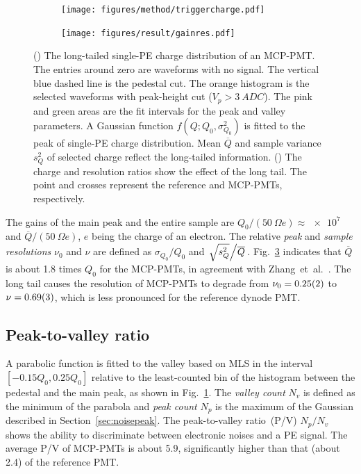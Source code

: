 \begin{figure}[!htbp]
    \centering
    \begin{subfigure}[b]{\SF\textwidth}
        \texttt{[image: figures/method/triggercharge.pdf]}
        \caption{}%
        \label{fig:triggercharge}
    \end{subfigure}
    \begin{subfigure}[b]{\SF\textwidth}
        \texttt{[image: figures/result/gainres.pdf]}
        \caption{}
        \label{fig:totalchargeCompare}
    \end{subfigure}
    \caption{() The long-tailed single-PE charge distribution of an MCP-PMT. The entries around zero are waveforms with no signal. The vertical blue dashed line is the pedestal cut. The orange histogram is the selected waveforms with peak-height cut ($V_p>\SI{3}{ADC}$). The pink and green areas are the fit intervals for the peak and valley parameters. A Gaussian function $f(Q;Q_0,\sigma^2_{Q_0})$ is fitted to the peak of single-PE charge distribution. Mean $\overline{Q}$ and sample variance $s_Q^2$ of selected charge reflect the long-tailed information. () The charge and resolution ratios show the effect of the long tail. The point and crosses represent the reference and MCP-PMTs, respectively.
    }
\end{figure}

The gains of the main peak and the entire sample are ${Q_0}/({\SI{50}{\Omega}} e) \approx \num{e7}$ and ${\overline{Q}}/(\SI{50}{\Omega} e)$, $e$ being the charge of an electron. The relative \emph{peak} and \emph{sample resolutions} $\nu_0$ and $\nu$ are defined as ${\sigma_{Q_0}}/{Q_0}$ and \(\left.{\sqrt{s^2_{Q}}}\middle/{\overline{Q}}\right.\). Fig.~\ref{fig:totalchargeCompare} indicates that $\overline{Q}$ is about 1.8 times $Q_0$ for the MCP-PMTs, in agreement with Zhang~et~al.~\cite{JUNOLongtail}. The long tail causes the resolution of MCP-PMTs to degrade from $\nu_0=\num{0.25 \pm 0.02}$ to $\nu=\num{0.69 \pm 0.03}$, which is less pronounced for the reference dynode PMT.

\subsection{Peak-to-valley ratio}
\label{sec:PV}
A parabolic function is fitted to the valley based on MLS in the interval $[-0.15Q_0, 0.25Q_0]$ relative to the least-counted bin of the histogram between the pedestal and the main peak, as shown in Fig.~\ref{fig:triggercharge}. The \emph{valley count} $N_v$ is defined as the minimum of the parabola and \emph{peak count} $N_p$ is the maximum of the Gaussian described in Section~\ref{sec:noisepeak}. The peak-to-valley ratio~(P/V) ${N_p}/{N_v}$ shows the ability to discriminate between electronic noises and a PE signal. The average P/V of MCP-PMTs is about 5.9, significantly higher than that (about 2.4) of the reference PMT.

